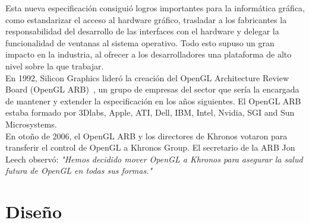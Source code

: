Esta nueva especificación consiguió logros importantes para la informática gráfica,
como estandarizar el acceso al hardware gráfico, trasladar a los fabricantes la
responsabilidad del desarrollo de las interfaces con el hardware y delegar la
funcionalidad de ventanas al sistema operativo. Todo esto supuso un gran impacto
en la industria, al ofrecer a los desarrolladores una plataforma de alto nivel
sobre la que trabajar.\\

En 1992, Silicon Graphics lideró la creación del OpenGL Architecture Review
Board (OpenGL ARB)~\cite{OpenGLARB}, un grupo de empresas del sector que sería la encargada de
mantener y extender la especificación en los años siguientes. El OpenGL ARB
estaba formado por 3Dlabs, Apple, ATI, Dell, IBM, Intel, Nvidia, SGI and Sun
Microsystems.\\

En otoño de 2006, el OpenGL ARB y los directores de Khronos votaron para transferir el
control de OpenGL a Khronos Group. El secretario de la ARB Jon Leech observó:
\textit{"Hemos decidido mover OpenGL a Khronos para asegurar la salud futura de
OpenGL en todas sus formas."}\cite{OpenGLARB}

\section{Diseño}
\label{makereference2.3}

